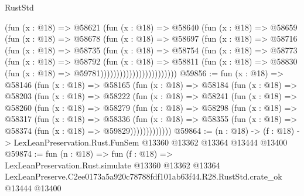 \begin{lexlean}{RustStd}
\begin{coremodule}
                          (fun (x : @18) =>
                          @58621
                            (fun (x : @18) =>
                            @58640
                              (fun (x : @18) =>
                              @58659
                                (fun (x : @18) =>
                                @58678
                                  (fun (x : @18) =>
                                  @58697
                                    (fun (x : @18) =>
                                    @58716
                                      (fun (x : @18) =>
                                      @58735
                                        (fun (x : @18) =>
                                        @58754
                                          (fun (x : @18) =>
                                          @58773
                                            (fun (x : @18) =>
                                            @58792
                                              (fun (x : @18) =>
                                              @58811
                                                (fun (x : @18) =>
                                                @58830
                                                  (fun (x : @18) => @59781))))))))))))))))))))))))
@59856 := fun (x : @18) =>
  @58146
    (fun (x : @18) =>
    @58165
      (fun (x : @18) =>
      @58184
        (fun (x : @18) =>
        @58203
          (fun (x : @18) =>
          @58222
            (fun (x : @18) =>
            @58241
              (fun (x : @18) =>
              @58260
                (fun (x : @18) =>
                @58279
                  (fun (x : @18) =>
                  @58298
                    (fun (x : @18) =>
                    @58317
                      (fun (x : @18) =>
                      @58336
                        (fun (x : @18) =>
                        @58355 (fun (x : @18) => @58374 (fun (x : @18) => @59829)))))))))))))
@59864 := (n : @18) ->
  (f : @18) -> LexLeanPreservation.Rust.FunSem @13360 @13362 @13364 @13444 @13400
@59874 := fun (n : @18) =>
  fun (f : @18) =>
  LexLeanPreservation.Rust.simulate
    @13360
    @13362
    @13364
    LexLeanPreserve.C2ee0173a5a920c78788fdf101ab63f44.R28.RustStd.crate_ok
    @13444
    @13400
\end{coremodule}
\end{lexlean}
